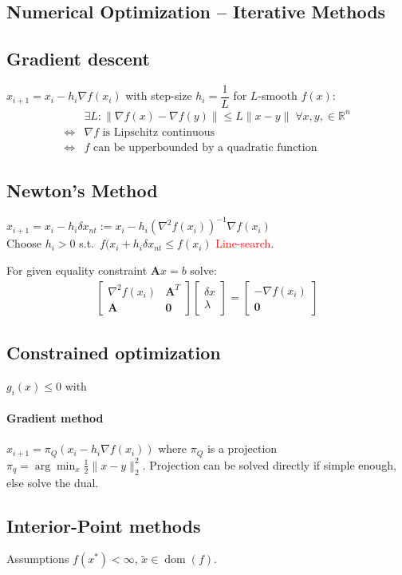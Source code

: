 \documentclass[landscape,a4paper,8pt]{scrartcl}
\newcommand{\remph}[1]{{\textcolor{red}{#1}}}
\newcommand{\R}{\mathbb R}
\newcommand\vA{\bm{A}}
\newcommand{\Me}[1]{\begin{bmatrix}#1\end{bmatrix}} %
\DeclareMathOperator\dom{dom}
\begin{document}
\begin{multicols*}{3}
\section{Numerical Optimization -- Iterative Methods}
\subsection{Gradient descent}
$x_{i+1} = x_i - h_i\nabla f(x_i)$ with step-size $h_i = \dfrac{1}{L}$ for
$L$-smooth $f(x)$:
\begin{align*}
     & \exists L: \lVert \nabla f(x) - \nabla f(y) \rVert \leq L \lVert x - y \rVert \; \forall x, y, \in \R^n \\
\iff & \nabla f \text{ is Lipschitz continuous} \\
\iff & f \text{ can be upperbounded by a quadratic function }
\end{align*}

\subsection{Newton's Method}
$x_{i+1} = x_i - h_i\delta x_{nt} := x_i - h_i (\nabla^2 f(x_i))^{-1} \nabla f(x_i)$ \\
Choose $h_i > 0$ s.t.\ $f(x_i + h_i\delta x_{nt} \leq f(x_i)$ \remph{Line-search}.

For given equality constraint $\vA x = b$ solve:
\begin{align*}
\Me{\nabla^2 f(x_i) & \vA^T \\ \vA & \bm 0}\Me{\delta x \\ \lambda} = \Me{-\nabla f(x_i) \\ \bm 0}
\end{align*}

\subsection{Constrained optimization}
$g_i(x) \leq 0$ with 
\paragraph{Gradient method}
$x_{i+1} = \pi_Q(x_i - h_i\nabla f(x_i))$ where $\pi_Q$ is a projection $\pi_q = \arg\min_x\frac{1}{2}\lVert x - y \rVert_2^2$. Projection can be solved directly if simple enough, else solve the dual.

\subsection{Interior-Point methods}
Assumptions $f(x^*) < \infty$, $\tilde x \in \dom(f)$.


\end{multicols*}
\end{document}
